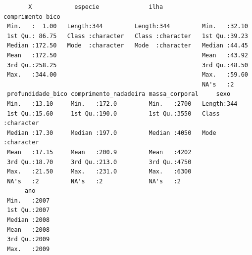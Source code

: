 \documentclass[
  letterpaper,
  DIV=11,
  numbers=noendperiod]{scrartcl}
\begin{document}
\begin{verbatim}
       X            especie              ilha           comprimento_bico
 Min.   :  1.00   Length:344         Length:344         Min.   :32.10   
 1st Qu.: 86.75   Class :character   Class :character   1st Qu.:39.23   
 Median :172.50   Mode  :character   Mode  :character   Median :44.45   
 Mean   :172.50                                         Mean   :43.92   
 3rd Qu.:258.25                                         3rd Qu.:48.50   
 Max.   :344.00                                         Max.   :59.60   
                                                        NA's   :2       
 profundidade_bico comprimento_nadadeira massa_corporal     sexo          
 Min.   :13.10     Min.   :172.0         Min.   :2700   Length:344        
 1st Qu.:15.60     1st Qu.:190.0         1st Qu.:3550   Class :character  
 Median :17.30     Median :197.0         Median :4050   Mode  :character  
 Mean   :17.15     Mean   :200.9         Mean   :4202                     
 3rd Qu.:18.70     3rd Qu.:213.0         3rd Qu.:4750                     
 Max.   :21.50     Max.   :231.0         Max.   :6300                     
 NA's   :2         NA's   :2             NA's   :2                        
      ano      
 Min.   :2007  
 1st Qu.:2007  
 Median :2008  
 Mean   :2008  
 3rd Qu.:2009  
 Max.   :2009  
               
\end{verbatim}
\end{document}
